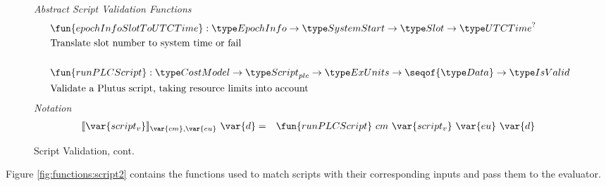 \begin{figure*}[htb]
  \emph{Abstract Script Validation Functions}
  \begin{align*}
     &\fun{epochInfoSlotToUTCTime} : \EpochInfo \to \SystemStart \to \Slot \to \UTCTime^? \\
     &\text{Translate slot number to system time or fail} \\~\\
     &\fun{runPLCScript} : \CostMod \to \ScriptPlutus \to \ExUnits \to \seqof{\Data} \to
     \IsValid \\
     &\text{Validate a Plutus script, taking resource limits into account}
  \end{align*}
  \emph{Notation}
  \begin{align*}
    \llbracket \var{script_v} \rrbracket_{\var{cm},\var{eu}}~\var{d}
    &=& \fun{runPLCScript}~{cm} ~\var{script_v}~\var{eu}~\var{d}
  \end{align*}
  \caption{Script Validation, cont.}
  \label{fig:defs:functions-valid}
\end{figure*}

Figure \ref{fig:functions:script2} contains the functions used to
match scripts with their corresponding inputs and pass them to the
evaluator.

